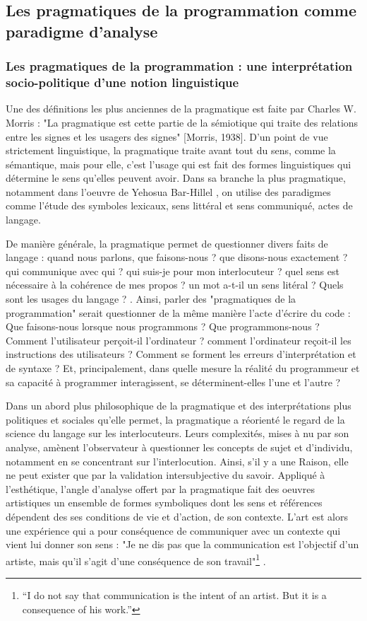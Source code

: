 \subsection{Les pragmatiques de la programmation comme paradigme d'analyse} \label{2.3.2}

\subsubsection{Les pragmatiques de la programmation : une interprétation socio-politique d'une notion linguistique} \label{2.3.2.a}

Une des définitions les plus anciennes de la pragmatique est faite par Charles W. Morris : "La pragmatique est cette partie de la sémiotique qui traite des relations entre les signes et les usagers des signes" [Morris, 1938]. D'un point de vue strictement linguistique, la pragmatique traite avant tout du sens, comme la sémantique, mais pour elle, c'est l'usage qui est fait des formes linguistiques qui détermine le sens qu'elles peuvent avoir. Dans sa branche la plus pragmatique, notamment dans l'oeuvre de Yehosua Bar-Hillel \citep{Barhillel1970}, on utilise des paradigmes comme l'étude des symboles lexicaux, sens littéral et sens communiqué, actes de langage.

De manière générale, la pragmatique permet de questionner divers faits de langage : quand nous parlons, que faisons-nous ? que disons-nous exactement ? qui communique avec qui ? qui suis-je pour mon interlocuteur ? quel sens est nécessaire à la cohérence de mes propos ? un mot a-t-il un sens litéral ? Quels sont les usages du langage ? \citep{Armengaud2007}. Ainsi, parler des "pragmatiques de la programmation" serait questionner de la même manière l'acte d'écrire du code : Que faisons-nous lorsque nous programmons ? Que programmons-nous ? Comment l'utilisateur perçoit-il l'ordinateur ? comment l'ordinateur reçoit-il les instructions des utilisateurs ?  Comment se forment les erreurs d'interprétation et de syntaxe ? Et, principalement, dans quelle mesure la réalité du programmeur et sa capacité à programmer interagissent, se déterminent-elles l'une et l'autre ?

Dans un abord plus philosophique de la pragmatique et des interprétations plus politiques et sociales qu'elle permet, la pragmatique a réorienté le regard de la science du langage sur les interlocuteurs. Leurs complexités, mises à nu par son analyse, amènent l'observateur à questionner les concepts de sujet et d'individu, notamment en se concentrant sur l'interlocution. Ainsi, s'il y a une Raison, elle ne peut exister que par la validation intersubjective du savoir. Appliqué à l'esthétique, l'angle d'analyse offert par la pragmatique fait des oeuvres artistiques un ensemble de formes symboliques dont les sens et références dépendent des ses conditions de vie et d'action, de son contexte. L'art est alors une expérience qui a pour conséquence de communiquer avec un contexte qui vient lui donner son sens : "Je ne dis pas que la communication est l'objectif d'un artiste, mais qu'il s'agit d'une conséquence de son travail"\footnote{“I do not say that communication is the intent of an artist. But it is a consequence of his work.”} \citep{Dewey1934}.

